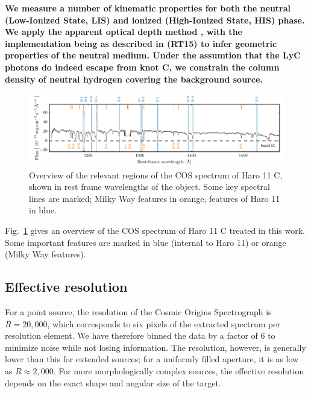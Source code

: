 \documentclass[twocolumn, trackchanges]{aastex61}
\begin{document}
\textbf{We measure a number of kinematic properties for both the neutral 
(Low-Ionized State, LIS) and ionized (High-Ionized State, HIS) phase. We apply 
the apparent optical depth method \citep[AOD, ][]{Savage1991, Pettini2002, Quider2009, Jones2013},
with the implementation being as described in \citet{RiveraThorsen2015} (RT15)
to infer geometric properties of the neutral medium. Under the assumtion that
the LyC photons do indeed escape from knot C, we constrain the 
column density of neutral hydrogen covering the background source.  
}

\begin{figure}
\centering
\includegraphics[]{./FullSpec.pdf}
\caption{Overview of the relevant regions of the COS spectrum of Haro 11
C, shown in rest frame wavelengths of the object. Some key spectral
lines are marked; Milky Way features in orange, features of Haro 11 in
blue.}\label{fig:fullspec}
\end{figure}

Fig.~\ref{fig:fullspec} gives an overview of the COS spectrum of Haro 11
C treated in this work. Some important features are marked in blue
(internal to Haro 11) or orange (Milky Way features).


\subsection{Effective resolution}\label{effective-resolution}

For a point source, the resolution of the Cosmic Origins Spectrograph is
$R=20,000$, which corresponds to six pixels of the extracted spectrum
per resolution element. We have therefore binned the data by a factor of
6 to minimize noise while not losing information. The resolution,
however, is generally lower than this for extended sources; for a
uniformly filled aperture, it is as low as $R\approx2,000$. For more
morphologically complex sources, the effective resolution depends on the
exact shape and angular size of the target.
\end{document}
